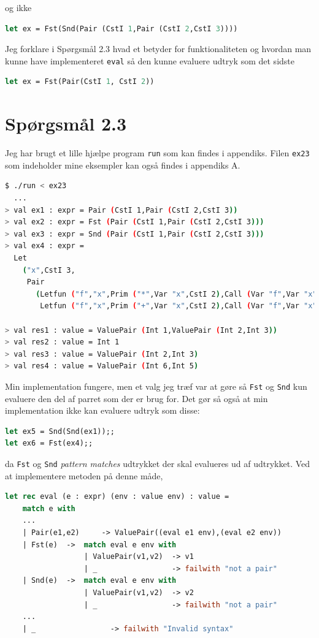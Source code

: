 \documentclass[danish,a4paper]{report}
\begin{document}
og ikke

\begin{lstlisting}[language=ML]
let ex = Fst(Snd(Pair (CstI 1,Pair (CstI 2,CstI 3))))
\end{lstlisting}

Jeg forklare i Spørgsmål 2.3 hvad et betyder for funktionaliteten og hvordan man kunne have implementeret \texttt{eval} så den kunne evaluere udtryk som det sidste 

\begin{lstlisting}[language=ML]
let ex = Fst(Pair(CstI 1, CstI 2))
\end{lstlisting}


\section*{Spørgsmål 2.3}

Jeg har brugt et lille hjælpe program \texttt{run} som kan findes i appendiks. Filen \texttt{ex23} som indeholder mine eksempler kan også findes i appendiks A.

\begin{lstlisting}[language=bash]
$ ./run < ex23
  ...
> val ex1 : expr = Pair (CstI 1,Pair (CstI 2,CstI 3))
> val ex2 : expr = Fst (Pair (CstI 1,Pair (CstI 2,CstI 3)))
> val ex3 : expr = Snd (Pair (CstI 1,Pair (CstI 2,CstI 3)))
> val ex4 : expr =
  Let
    ("x",CstI 3,
     Pair
       (Letfun ("f","x",Prim ("*",Var "x",CstI 2),Call (Var "f",Var "x")),
        Letfun ("f","x",Prim ("+",Var "x",CstI 2),Call (Var "f",Var "x"))))

> val res1 : value = ValuePair (Int 1,ValuePair (Int 2,Int 3))
> val res2 : value = Int 1
> val res3 : value = ValuePair (Int 2,Int 3)
> val res4 : value = ValuePair (Int 6,Int 5)
\end{lstlisting}

Min implementation fungere, men et valg jeg træf var at gøre så \texttt{Fst} og \texttt{Snd} kun evaluere den del af parret som der er brug for. Det gør så også at min implementation ikke kan evaluere udtryk som disse:

\begin{lstlisting}[language=ML]
let ex5 = Snd(Snd(ex1));;
let ex6 = Fst(ex4);;
\end{lstlisting}

da \texttt{Fst} og \texttt{Snd} \textit{pattern matches} udtrykket der skal evalueres ud af udtrykket. Ved at implementere metoden på denne måde,

\begin{lstlisting}[language=ML]
let rec eval (e : expr) (env : value env) : value =
    match e with
    ...
    | Pair(e1,e2)     -> ValuePair((eval e1 env),(eval e2 env)) 
    | Fst(e)  ->  match eval e env with
                  | ValuePair(v1,v2)  -> v1
                  | _                 -> failwith "not a pair"
    | Snd(e)  ->  match eval e env with
                  | ValuePair(v1,v2)  -> v2
                  | _                 -> failwith "not a pair" 
    ...
    | _                 -> failwith "Invalid syntax"
\end{lstlisting}
\end{document}
